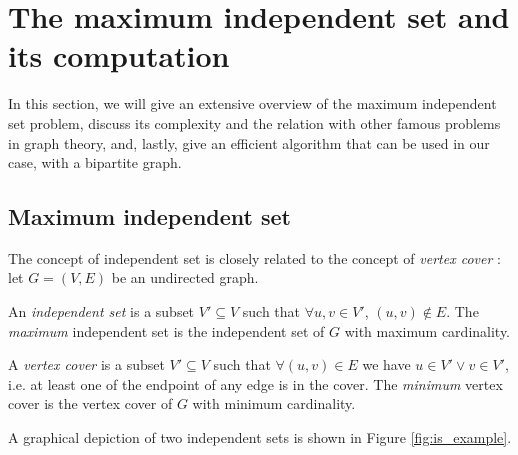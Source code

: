 \section{The maximum independent set and its computation} \label{sec:is_comp}

In this section, we will give an extensive overview of the maximum independent set problem, discuss its complexity and the relation with other famous problems in graph theory, and, lastly, give an efficient algorithm that can be used in our case, with a bipartite graph.

\subsection{Maximum independent set}

The concept of independent set is closely related to the concept of \emph{vertex cover} \cite{np_book}: let $G=(V,E)$ be an undirected graph.

\begin{definition}
	An \emph{independent set} is a subset $V' \subseteq V$ such that $ \forall u,v \in V'$, $(u,v) \notin E$.
	The \emph{maximum} independent set is the independent set of $G$ with maximum cardinality.
\end{definition}

\begin{definition}
	A \emph{vertex cover} is a subset $V' \subseteq V$ such that $\forall (u,v) \in E$ we have $u \in V' \vee v \in V'$, i.e. at least one of the endpoint of any edge is in the cover. The \emph{minimum} vertex cover is the vertex cover of $G$ with minimum cardinality.
\end{definition}

A graphical depiction of two independent sets is shown in Figure \ref{fig:is_example}.

